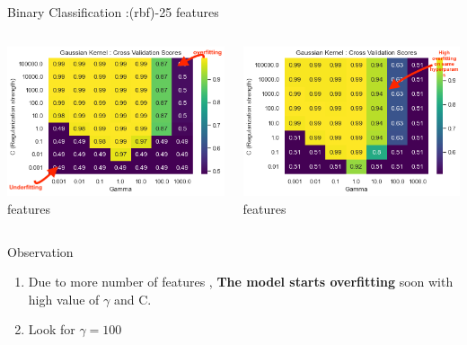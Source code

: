 \documentclass[12pt,t]{beamer}
\begin{document}
\begin{frame}[t]{Binary Classification :(rbf)-25 features}
    \scriptsize

    \begin{columns}
        \begin{column}[T]{0.50\linewidth}
            \includegraphics[width=\linewidth]{images/p1a/2(binary clf)/classes1and4_libsvm_rbf.png}
             features
        \end{column}
        \begin{column}[T]{0.50\linewidth}
            \includegraphics[width=\linewidth]{images/p1a/2(binary clf)/classes1and4_libsvm_rbf25f.png}
             features
        \end{column}
    \end{columns}

    \begin{block}{Observation}
        \begin{enumerate}
            \item Due to more number of features , \textbf{The model starts overfitting} soon 
                with high value of $\gamma$ and C.
            \item Look for $\gamma =100$
        \end{enumerate}
    \end{block}
\end{frame}
\end{document}
